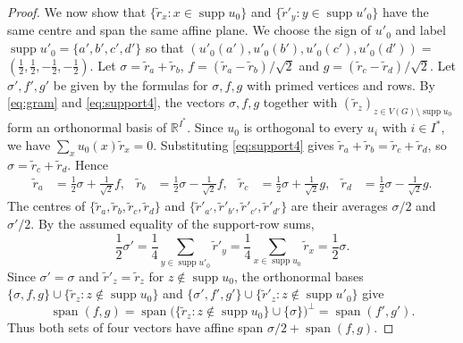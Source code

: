 \documentclass[11pt,a4paper]{article}
\theoremstyle{plain}
\theoremstyle{definition}
\DeclareMathOperator{\supp}{supp}
\DeclareMathOperator{\spn}{span}
\newcommand{\R}{\mathbb{R}}
\begin{document}
\begin{proof}
  We now show that $\{\tilde{r}_x:x\in\supp u_0\}$ and
  $\{\tilde{r}'_y:y\in\supp u'_0\}$ have the same centre and span the
  same affine plane.
  We choose the sign of $u'_0$ and label
  $\supp u'_0=\{a',b',c',d'\}$ so that
  $(u'_0(a'),u'_0(b'),u'_0(c'),u'_0(d'))=$
  $(\tfrac12,\tfrac12,-\tfrac12,-\tfrac12)$.
  Let $\sigma = \tilde{r}_a + \tilde{r}_b$,
  $f = (\tilde{r}_a - \tilde{r}_b)/\sqrt{2}$ and
  $g = (\tilde{r}_c - \tilde{r}_d)/\sqrt{2}$.
  Let $\sigma',f',g'$ be given by the formulas for $\sigma,f,g$ with
  primed vertices and rows.
  By \cref{eq:gram} and
  \cref{eq:support4}, the vectors $\sigma,f,g$ together with
  $(\tilde{r}_z)_{z\in V(G)\setminus\supp u_0}$ form an orthonormal basis of
  $\R^{I^*}$. Since $u_0$ is orthogonal to every $u_i$ with $i\in I^*$,
  we have $\sum_xu_0(x)\tilde{r}_x=0$.
  Substituting \cref{eq:support4} gives
  $\tilde{r}_a+\tilde{r}_b=\tilde{r}_c+\tilde{r}_d$, so $\sigma=\tilde{r}_c+\tilde{r}_d$. Hence
  \begin{equation}
    \label{eq:special-rows}
    \begin{aligned}
    \tilde{r}_a &= \frac{1}{2} \sigma + \frac{1}{\sqrt{2}} f, &
    \tilde{r}_b &= \frac{1}{2} \sigma - \frac{1}{\sqrt{2}} f, &
    \tilde{r}_c &= \frac{1}{2} \sigma + \frac{1}{\sqrt{2}} g, &
    \tilde{r}_d &= \frac{1}{2} \sigma - \frac{1}{\sqrt{2}} g.
    \end{aligned}
  \end{equation}
  The centres of $\{\tilde{r}_a,\tilde{r}_b,\tilde{r}_c,\tilde{r}_d\}$ and
  $\{\tilde{r}'_{a'},\tilde{r}'_{b'},\tilde{r}'_{c'},\tilde{r}'_{d'}\}$ are their averages
  $\sigma/2$ and $\sigma'/2$. By the assumed equality of the support-row sums,
  \begin{equation}\label{eq:quartet-offset}
    \frac12\sigma'=\frac14\sum_{y\in\supp u'_0}\tilde{r}'_y
    =\frac14\sum_{x\in\supp u_0}\tilde{r}_x=\frac12\sigma.
  \end{equation}
  Since $\sigma'=\sigma$ and $\tilde{r}'_z=\tilde{r}_z$ for
  $z\notin\supp u_0$, the orthonormal bases
  $\{\sigma,f,g\}\cup\{\tilde{r}_z:z\notin\supp u_0\}$ and
  $\{\sigma',f',g'\}\cup\{\tilde{r}'_z:z\notin\supp u'_0\}$ give
  \begin{equation}\label{eq:quartet-plane}
   \spn(f,g)
   =\spn\bigl(\{\tilde{r}_z:z\notin\supp u_0\}\cup\{\sigma\}\bigr)^\perp
   =\spn(f',g').
  \end{equation}
  Thus both sets of four vectors have affine span $\sigma/2+\spn(f,g)$.


\end{proof}
\end{document}
